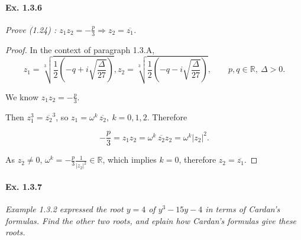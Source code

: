 \documentclass[11pt,a4paper]{article}
\newcommand{\R}{\mathbb{R}}
\begin{document}
\paragraph{Ex. 1.3.6}

{\it Prove (1.24) : $z_1z_2 = -\frac{p}{3} \Rightarrow z_2 = \overline{z_1}$.
}

\begin{proof}
In the context of paragraph 1.3.A, 
$$z_1 = \sqrt[3]{\frac{1}{2}\left(-q+i\sqrt{\frac{\Delta}{27}} \right)}, z_2 = \sqrt[3]{\frac{1}{2}\left(-q-i\sqrt{\frac{\Delta}{27}} \right)}, \qquad p,q \in \R,\  \Delta>0.$$

We know $z_1z_2 = -\frac{p}{3}$. 

Then $z_1^3 = \overline{z_2}^3$, so $z_1 = \omega^k \, \overline{z_2},\ k=0,1,2$. Therefore

$$-\frac{p}{3} = z_1 z_2 = \omega^k \, \overline{z_2} z_2 =\omega^k \vert z_2 \vert ^2.$$

As $z_2 \neq 0$, $\omega^k = -\frac{p}{3} \frac{1}{\vert z_2 \vert ^2} \in \mathbb{R}$, which implies $k=0$, therefore $z_2 = \overline{z_1}$.
\end{proof}

\paragraph{Ex. 1.3.7}

{\it Example 1.3.2 expressed the root $y=4$ of $y^3-15y-4$ in terms of Cardan's formulas. Find the other two roots, and eplain how Cardan's formulas give these roots.
}
\end{document}
